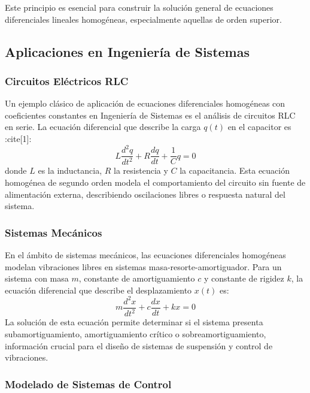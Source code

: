 \documentclass[12pt,a4paper]{article}
\begin{document}
Este principio es esencial para construir la solución general de ecuaciones diferenciales lineales homogéneas, especialmente aquellas de orden superior.

\subsection{Aplicaciones en Ingeniería de Sistemas}

\subsubsection{Circuitos Eléctricos RLC}

Un ejemplo clásico de aplicación de ecuaciones diferenciales homogéneas con coeficientes constantes en Ingeniería de Sistemas es el análisis de circuitos RLC en serie. La ecuación diferencial que describe la carga $q(t)$ en el capacitor es :cite[1]:
\begin{equation}
L \frac{d^2q}{dt^2} + R \frac{dq}{dt} + \frac{1}{C} q = 0
\end{equation}
donde $L$ es la inductancia, $R$ la resistencia y $C$ la capacitancia. Esta ecuación homogénea de segundo orden modela el comportamiento del circuito sin fuente de alimentación externa, describiendo oscilaciones libres o respuesta natural del sistema.

\subsubsection{Sistemas Mecánicos}

En el ámbito de sistemas mecánicos, las ecuaciones diferenciales homogéneas modelan vibraciones libres en sistemas masa-resorte-amortiguador. Para un sistema con masa $m$, constante de amortiguamiento $c$ y constante de rigidez $k$, la ecuación diferencial que describe el desplazamiento $x(t)$ es:
\begin{equation}
m \frac{d^2x}{dt^2} + c \frac{dx}{dt} + k x = 0
\end{equation}
La solución de esta ecuación permite determinar si el sistema presenta subamortiguamiento, amortiguamiento crítico o sobreamortiguamiento, información crucial para el diseño de sistemas de suspensión y control de vibraciones.

\subsubsection{Modelado de Sistemas de Control}
\end{document}
